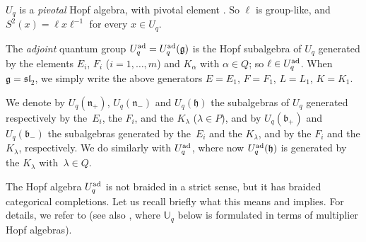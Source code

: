 \documentclass[pdftex]{sigma}
\numberwithin{equation}{section}
\theoremstyle{definition}
\newcommand{\mUq}{\mathbb{U}_q}
\begin{document}
$U_q$ is a {\it pivotal} Hopf algebra, with pivotal element .
So $\ell$ is group-like, and $S^2(x) = \ell x\ell^{-1}$ for every $x\in U_q$.

The {\it adjoint} quantum group $U_q^{\rm ad} = U_q^{\rm ad}(\mathfrak{g})$ is the Hopf subalgebra of $U_q$ generated by the elements $E_i$, $F_i$ ($i=1,\dots,m$) and $K_\alpha$ with $\alpha\in Q$; so $\ell\in U_q^{\rm ad}$. When $\mathfrak{g}={\mathfrak{sl}_2}$, we simply write the above generators $E=E_1$, $F=F_1$, $L=L_1$, $K=K_1$.

We denote by $U_q(\mathfrak{n}_+)$, $U_q(\mathfrak{n}_-)$ and $U_q(\mathfrak{h})$ the subalgebras of $U_q$ generated respectively by the~$E_i$, the $F_i$, and the $K_\lambda$ ($\lambda\in P$), and by $U_q(\mathfrak{b}_+)$ and $U_q(\mathfrak{b}_-)$ the subalgebras generated by the~$E_i$ and the $K_\lambda$, and by the $F_i$ and the $K_\lambda$, respectively. We do similarly with $U_q^{\rm ad}$, where now $U_q^{\rm ad}(\mathfrak{h})$ is generated by the $K_\lambda$ with~$\lambda\in Q$.

The Hopf algebra $U_q^{\rm ad}$ is not braided in a strict sense, but it has braided categorical completions. Let us recall briefly what this means and implies. For details, we refer to \cite[Sections~2 and~3]{BR} (see also \cite[Section~3.10]{VY}, where $\mUq$ below is formulated in terms of multiplier Hopf algebras).
\end{document}
